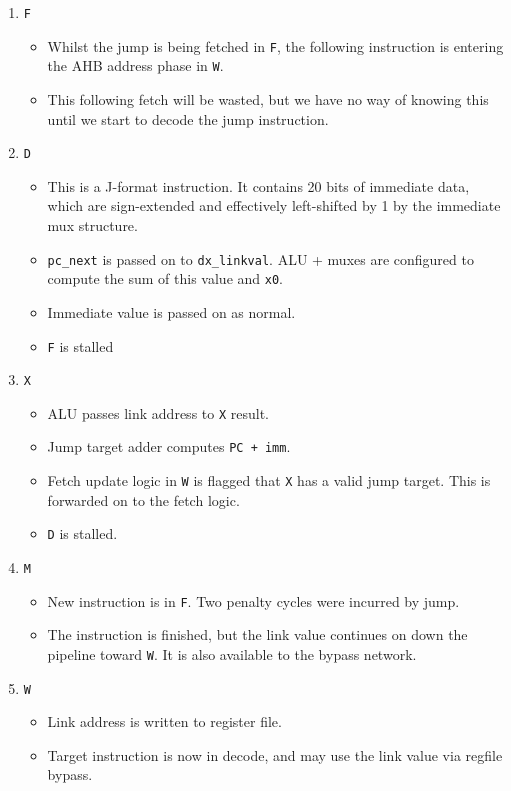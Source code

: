 \documentclass{article}
\begin{document}
\begin{enumerate}
	\item \texttt{F}
	\begin{itemize}
		\item Whilst the jump is being fetched in \texttt{F}, the following instruction is entering the AHB address phase in \texttt{W}.
		\item This following fetch will be wasted, but we have no way of knowing this until we start to decode the jump instruction.
	\end{itemize}
	\item \texttt{D}
	\begin{itemize}
		\item This is a J-format instruction. It contains 20 bits of immediate data, which are sign-extended and effectively left-shifted by 1 by the immediate mux structure.
		\item \texttt{pc\_next} is passed on to \texttt{dx\_linkval}. ALU + muxes are configured to compute the sum of this value and \texttt{x0}.
		\item Immediate value is passed on as normal.
		\item \texttt{F} is stalled
	\end{itemize}
	\item \texttt{X}
	\begin{itemize}
		\item ALU passes link address to \texttt{X} result.
		\item Jump target adder computes \texttt{PC + imm}.
		\item Fetch update logic in \texttt{W} is flagged that \texttt{X} has a valid jump target. This is forwarded on to the fetch logic.
		\item \texttt{D} is stalled.
	\end{itemize}
	\item \texttt{M}
	\begin{itemize}
		\item New instruction is in \texttt{F}. Two penalty cycles were incurred by jump.
		\item The instruction is finished, but the link value continues on down the pipeline toward \texttt{W}. It is also available to the bypass network.
	\end{itemize}
	\item \texttt{W}
	\begin{itemize}
		\item Link address is written to register file.
		\item Target instruction is now in decode, and may use the link value via regfile bypass.
	\end{itemize}
\end{enumerate}
\end{document}
